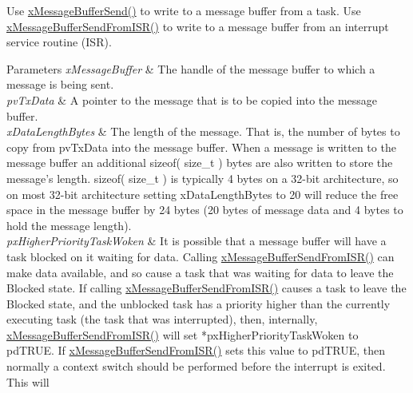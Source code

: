 \begin{DoxyPre}
\begin{DoxyPre}   Use \hyperlink{message__buffer_8h_a858f6da6fe24a226c45caf1634ea1605}{xMessageBufferSend()} to write to a message buffer from a task.  Use
   \hyperlink{message__buffer_8h_aeef5b0c4f8c2db6ca2230a8874813e79}{xMessageBufferSendFromISR()} to write to a message buffer from an interrupt
   service routine (ISR).\end{DoxyPre}
\end{DoxyPre}



\begin{DoxyPre}
\begin{DoxyPre}   
\begin{DoxyParams}{Parameters}
{\em xMessageBuffer} & The handle of the message buffer to which a message is
   being sent.\\
\hline
{\em pvTxData} & A pointer to the message that is to be copied into the
   message buffer.\\
\hline
{\em xDataLengthBytes} & The length of the message.  That is, the number of
   bytes to copy from pvTxData into the message buffer.  When a message is
   written to the message buffer an additional sizeof( size\_t ) bytes are also
   written to store the message's length.  sizeof( size\_t ) is typically 4 bytes
   on a 32-bit architecture, so on most 32-bit architecture setting
   xDataLengthBytes to 20 will reduce the free space in the message buffer by 24
   bytes (20 bytes of message data and 4 bytes to hold the message length).\\
\hline
{\em pxHigherPriorityTaskWoken} & It is possible that a message buffer will
   have a task blocked on it waiting for data.  Calling
   \hyperlink{message__buffer_8h_aeef5b0c4f8c2db6ca2230a8874813e79}{xMessageBufferSendFromISR()} can make data available, and so cause a task that
   was waiting for data to leave the Blocked state.  If calling
   \hyperlink{message__buffer_8h_aeef5b0c4f8c2db6ca2230a8874813e79}{xMessageBufferSendFromISR()} causes a task to leave the Blocked state, and the
   unblocked task has a priority higher than the currently executing task (the
   task that was interrupted), then, internally, \hyperlink{message__buffer_8h_aeef5b0c4f8c2db6ca2230a8874813e79}{xMessageBufferSendFromISR()}
   will set *pxHigherPriorityTaskWoken to pdTRUE.  If
   \hyperlink{message__buffer_8h_aeef5b0c4f8c2db6ca2230a8874813e79}{xMessageBufferSendFromISR()} sets this value to pdTRUE, then normally a
   context switch should be performed before the interrupt is exited.  This will

\end{DoxyParams}
\end{DoxyPre}
\end{DoxyPre}
